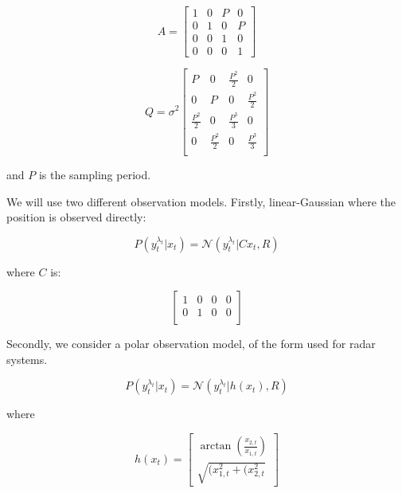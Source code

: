\begin{equation}
A = \begin{bmatrix}
1 & 0 & P & 0 \\
0 & 1 & 0 & P \\
0 & 0 & 1 & 0 \\
0 & 0 & 0 & 1
\end{bmatrix}
\label{eq:}
\end{equation}

\begin{equation}
Q = \sigma^2 \begin{bmatrix}
P & 0 & \frac{P^2}{2} & 0 \\
0 & P & 0 & \frac{P^2}{2} \\
\frac{P^2}{2} & 0 & \frac{P^3}{3} & 0 \\
0 & \frac{P^2}{2} & 0 & \frac{P^3}{3} \\
\end{bmatrix}
\label{eq:}
\end{equation}

and $P$ is the sampling period.

We will use two different observation models. Firstly, linear-Gaussian where the position is observed directly:

\begin{equation}
P(y_t^{\lambda_t}|x_t) = \mathcal{N}(y_t^{\lambda_t}|C x_t, R)
\label{eq:}
\end{equation}

where $C$ is:

\begin{equation}
\begin{bmatrix}
1 & 0 & 0 & 0 \\
0 & 1 & 0 & 0 \\
\end{bmatrix}
\label{eq:}
\end{equation}

Secondly, we consider a polar observation model, of the form used for radar systems.

\begin{equation}
P(y_t^{\lambda_t}|x_t) = \mathcal{N}(y_t^{\lambda_t}|h(x_t), R)
\label{eq:}
\end{equation}

where

\begin{equation}
h(x_t) = \begin{bmatrix}
\arctan \left( \frac{x_{2,t}}{x_{1,t}} \right)\\
\sqrt{ (x_{1,t}^2 + (x_{2,t}^2 }
\end{bmatrix}
\label{eq:}
\end{equation}

